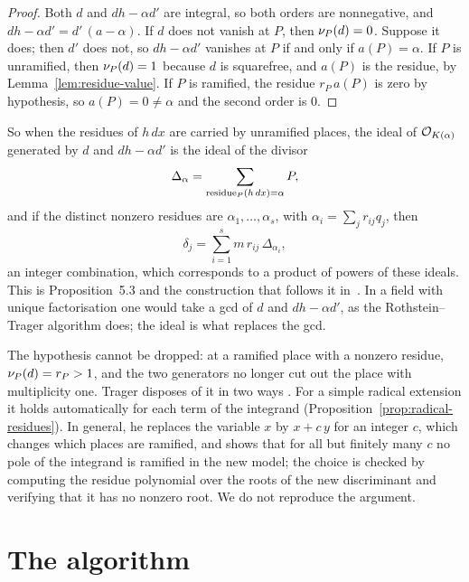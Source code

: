 \begin{proof}
Both $d$ and $dh - \alpha d'$ are integral, so both orders are nonnegative,
and $dh - \alpha d' = d'\,(a - \alpha)$. If $d$ does not vanish at $P$, then
$\nu_{P}(d) = 0$. Suppose it does; then $d'$ does not, so $dh - \alpha d'$
vanishes at $P$ if and only if $a(P) = \alpha$. If $P$ is unramified, then
$\nu_{P}(d) = 1$ because $d$ is squarefree, and $a(P)$ is the residue, by
Lemma~\ref{lem:residue-value}. If $P$ is ramified, the residue $r_P\, a(P)$ is
zero by hypothesis, so $a(P) = 0 \ne \alpha$ and the second order is $0$.
\end{proof}

So when the residues of $h\,dx$ are carried by unramified places, the ideal of $\mathcal{O}_{K(\alpha)}$
generated by $d$ and $dh - \alpha d'$ is the ideal of the divisor
\[
  \Delta_\alpha = \sum_{\operatorname{residue}_P(h\,dx) = \alpha} P ,
\]
and if the distinct nonzero residues are $\alpha_1, \dots, \alpha_s$, with
$\alpha_i = \sum_j r_{ij} q_j$, then
\[
  \delta_j = \sum_{i=1}^s m\, r_{ij}\, \Delta_{\alpha_i} ,
\]
an integer combination, which corresponds to a product of powers of these
ideals. This is Proposition~5.3 and the construction that follows it
in~\cite{trager1984}. In a field with unique factorisation one would take a
gcd of $d$ and $dh - \alpha d'$, as the Rothstein--Trager algorithm does; the
ideal is what replaces the gcd.

The hypothesis cannot be dropped: at a ramified place with a nonzero
residue, $\nu_{P}(d) = r_P > 1$, and the two generators no longer cut out the
place with multiplicity one. Trager disposes of it in two ways
\cite[\S5.4]{trager1984}. For a simple radical extension it holds
automatically for each term of the integrand
(Proposition~\ref{prop:radical-residues}). In general, he replaces the variable $x$ by $x +
c\,y$ for an integer $c$, which changes which places are ramified, and
shows that for all but finitely many $c$ no pole of the integrand is
ramified in the new model; the choice is checked by computing the residue
polynomial over the roots of the new discriminant and verifying that it has
no nonzero root. We do not reproduce the argument.

\section{The algorithm}\label{sec:log-algorithm}

